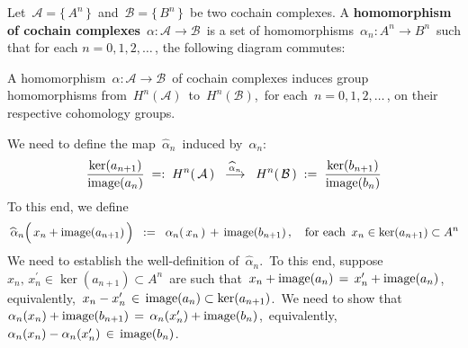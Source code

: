 \begin{definition}
\mbox{}
\vskip 0.1cm
\noindent
Let
\,$\mathcal{A} = \{\,A^{n}\,\}$\,
and
\,$\mathcal{B} = \{\,B^{n}\,\}$\,
be two cochain complexes.
A \textbf{homomorphism of cochain complexes}
\,$\alpha : \mathcal{A} \longrightarrow \mathcal{B}$\,
is a set of homomorphisms
\,$\alpha_{n} : A^{n} \longrightarrow B^{n}$\,
such that for each $n = 0, 1, 2, \ldots$\,,
the following diagram commutes:
\begin{center}
\end{center}
\end{definition}


\begin{proposition}
\mbox{}
\vskip 0.1cm
\noindent
A homomorphism \,$\alpha : \mathcal{A} \longrightarrow \mathcal{B}$\,
of cochain complexes induces group homomorphisms from
\,$H^{n}(\mathcal{A})$\, to \,$H^{n}(\mathcal{B})$,\, for each \,$n = 0, 1, 2, \ldots$\,,
on their respective cohomology groups.
\end{proposition}
\proof
We need to define the map \,$\widehat{\alpha}_{n}$\, induced by \,$\alpha_{n}$:\,
\begin{equation*}
\dfrac{\ker(a_{n+1})}{\textnormal{image}(a_{n})}
\; =: \;
	H^{n}(\,\mathcal{A}\,)
\;\; \overset{\widehat{\alpha}_{n}}{\longrightarrow} \;\;
	H^{n}(\,\mathcal{B}\,)
\; := \;
	\dfrac{\ker(b_{n+1})}{\textnormal{image}(b_{n})}
\end{equation*}
To this end, we define
\begin{equation*}
\widehat{\,\alpha}_{n}\!\left(\,x_{n} \overset{{\color{white}.}}{+} \image(a_{n+1})\,\right)
\;\; := \;\;
	\alpha_{n}(\,x_{n}\,) \,+\, \image(b_{n+1})\,,
\quad
\textnormal{for each \,$x_{n} \in \ker(a_{n+1}) \subset A^{n}$}
\end{equation*}
We need to establish the well-definition of \,$\widehat{\alpha}_{n}$.\,
To this end, suppose
\,$x_{n},\, x_{n}^{\prime} \in \ker(a_{n+1}) \subset A^{n}$\,
are such that
\,$x_{n} + \textnormal{image}(a_{n}) \,=\, x_{n}^{\prime} + \textnormal{image}(a_{n})$,\,
equivalently, \,$x_{n} - x_{n}^{\prime} \,\in\, \textnormal{image}(a_{n}) \subset \ker(a_{n+1})$.\,
We need to show that
\,$\alpha_{n}(x_{n}) + \textnormal{image}(b_{n+1}) \,=\, \alpha_{n}(x_{n}^{\prime}) + \textnormal{image}(b_{n})$,\,
equivalently, \,$\alpha_{n}(x_{n}) - \alpha_{n}(x_{n}^{\prime}) \,\in\, \textnormal{image}(b_{n})$.\,

